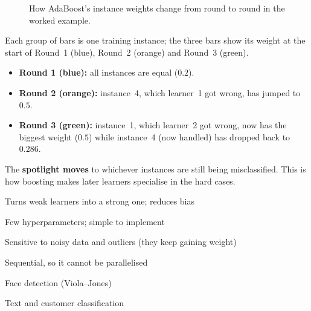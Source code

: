 \begin{figure}[!htbp]
\centering
{}
\caption{How AdaBoost's instance weights change from round to round in the worked example.}\label{fig:adaw}
\end{figure}

\begin{explain}
Each group of bars is one training instance; the three bars show its weight at the start of Round~1 (blue), Round~2 (orange) and Round~3 (green).

\begin{itemize}
  \item \textbf{Round 1 (blue):} all instances are equal ($0.2$).
  \item \textbf{Round 2 (orange):} instance~4, which learner~1 got wrong, has jumped to $0.5$.
  \item \textbf{Round 3 (green):} instance~1, which learner~2 got wrong, now has the biggest weight ($0.5$) while instance~4 (now handled) has dropped back to $0.286$.
\end{itemize}
The \textbf{spotlight moves} to whichever instances are still being misclassified. This is how boosting makes later learners specialise in the hard cases.
\end{explain}


{\item Turns weak learners into a strong one; reduces bias
 \item Few hyperparameters; simple to implement}
{\item Sensitive to noisy data and outliers (they keep gaining weight)
 \item Sequential, so it cannot be parallelised}
{\item Face detection (Viola--Jones)
 \item Text and customer classification}

